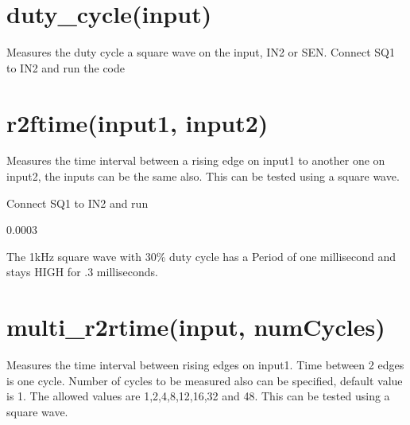 \documentclass[a4paper,12pt,english]{sphinxmanual}
\begin{document}
\begin{sphinxVerbatim}[commandchars=\\\{\}]
 
\end{sphinxVerbatim}


\section{duty\_cycle(input)}
\label{\detokenize{7.1:duty-cycle-input}}
Measures the duty cycle a square wave on the input, IN2 or SEN. Connect
SQ1 to IN2 and run the code

\begin{sphinxVerbatim}[commandchars=\\\{\}]
 
 
\end{sphinxVerbatim}


\section{r2ftime(input1, input2)}
\label{\detokenize{7.1:r2ftime-input1-input2}}
Measures the time interval between a rising edge on input1 to another
one on input2, the inputs can be the same also. This can be tested using
a square wave.

Connect SQ1 to IN2 and run

\begin{sphinxVerbatim}[commandchars=\\\{\}]
 
  
\end{sphinxVerbatim}

0.0003

The 1kHz square wave with 30\% duty cycle has a Period of one millisecond
and stays HIGH for .3 milliseconds.


\section{multi\_r2rtime(input, numCycles)}
\label{\detokenize{7.1:multi-r2rtime-input-numcycles}}
Measures the time interval between rising edges on input1. Time between
2 edges is one cycle. Number of cycles to be measured also can be
specified, default value is 1. The allowed values are 1,2,4,8,12,16,32
and 48. This can be tested using a square wave.
\end{document}
